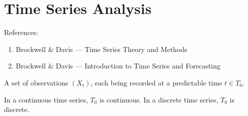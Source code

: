 
\chapter{Time Series Analysis}
\label{cha:time-series-analysis}

References: 
\begin{enumerate}
\item Brockwell \& Davis --- Time Series Theory and Methods
\item Brockwell \& Davis --- Introduction to Time Series and Forecasting
\end{enumerate}

\begin{defn}
  \label{defn:time_series:1}
  A set of observations $(X_{t})$, each being recorded at a predictable
  time $t \in T_{0}$.

  In a continuous time series, $T_{0}$ is continuous.  In a discrete
  time series, $T_{0}$ is discrete.
\end{defn}

